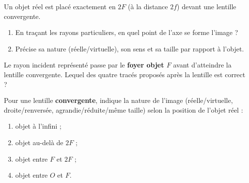 \documentclass[11pt,a4paper]{article}
\begin{document}

\begin{exo}
Un objet réel est placé exactement en $2F$ (à la distance $2f$) devant une lentille convergente.
\begin{enumerate}[label=\alph*)]
  \item En traçant les rayons particuliers, en quel point de l'axe se forme l'image ?
  \item Précise sa nature (réelle/virtuelle), son sens et sa taille par rapport à l'objet.
\end{enumerate}
\end{exo}

\begin{exo}
Le rayon incident représenté passe par le \textbf{foyer objet $F$} avant d'atteindre la lentille
convergente. Lequel des quatre tracés proposés après la lentille est correct ?
\begin{center}
\end{center}
\end{exo}

\begin{exo}
Pour une lentille \textbf{convergente}, indique la nature de l'image (réelle/virtuelle, droite/renversée,
agrandie/réduite/même taille) selon la position de l'objet réel :
\begin{enumerate}[label=\alph*)]
  \item objet à l'infini ;
  \item objet au-delà de $2F$ ;
  \item objet entre $F$ et $2F$ ;
  \item objet entre $O$ et $F$.
\end{enumerate}
\end{exo}
\end{document}
